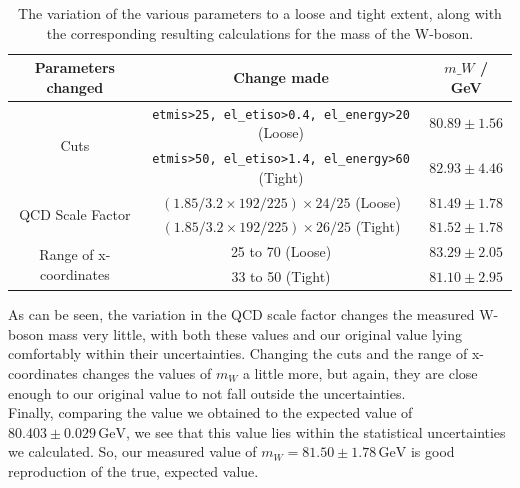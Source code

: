 \begin{table}[H]
    \centering
    \begin{tabular}{ccc}
        Parameters changed & Change made & $m\_W$ / GeV \\
        
        \hline
        \multirow{2}{*}{Cuts} & \texttt{etmis\textgreater{}25, el\_etiso\textgreater{}0.4, el\_energy\textgreater{}20} (Loose) & $80.89 \pm 1.56$ \\
        & \texttt{etmis\textgreater{}50, el\_etiso\textgreater{}1.4, el\_energy\textgreater{}60} (Tight) & $82.93 \pm 4.46$ \\
        
        \hline
        \multirow{2}{*}{QCD Scale Factor} & $(1.85/3.2 \times 192/225) \times 24/25$ (Loose) & $81.49 \pm 1.78$ \\
        & $(1.85/3.2 \times 192/225) \times 26/25$ (Tight) & $81.52 \pm 1.78$ \\
        
        \hline
        \multirow{2}{*}{Range of x-coordinates} & 25 to 70 (Loose) & $83.29 \pm 2.05$ \\
        & 33 to 50 (Tight) & $81.10 \pm 2.95$ \\
        \hline
    \end{tabular}
    \caption{The variation of the various parameters to a loose and tight extent, along with the corresponding resulting calculations for the mass of the W-boson.}
    \label{systerr}
\end{table}

\noindent As can be seen, the variation in the QCD scale factor changes the measured W-boson mass very little, with both these values and our original value lying comfortably within their uncertainties. Changing the cuts and the range of x-coordinates changes the values of $m_W$ a little more, but again, they are close enough to our original value to not fall outside the uncertainties.\\

\noindent Finally, comparing the value we obtained to the expected value of $80.403\pm0.029\,\text{GeV}$, we see that this value lies within the statistical uncertainties we calculated. So, our measured value of $m_W = 81.50\pm1.78\,\text{GeV}$ is good reproduction of the true, expected value.\\
